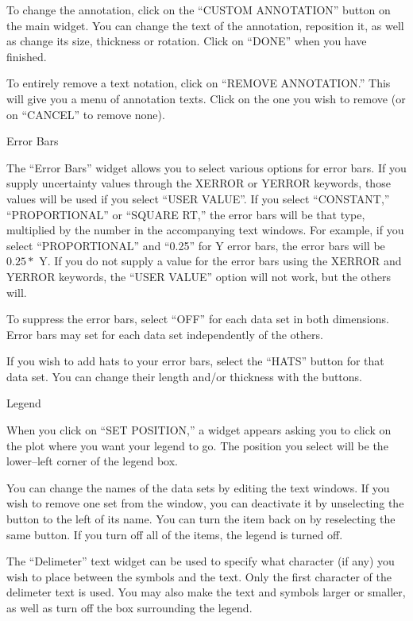 To change the annotation, click on the ``CUSTOM ANNOTATION'' button on the
main widget.  You can change the text of the annotation, reposition it, as 
well as change its size, thickness or rotation.  Click on ``DONE'' when you
have finished.  

To entirely remove a text notation, click on ``REMOVE ANNOTATION.''  This will
give you a menu of annotation texts.  Click on the one you wish to remove (or 
on ``CANCEL'' to remove none).

\vskip 3mm \centerline{\rmtwelve Error Bars}
	
The ``Error Bars'' widget allows you to select various options for error bars.
If you supply uncertainty values through the XERROR or YERROR keywords, those
values will be used if you select ``USER VALUE''.  If you select ``CONSTANT,''
``PROPORTIONAL'' or ``SQUARE RT,'' the error bars will be that type, multiplied
by the number in the accompanying text windows.  For example, if you select
``PROPORTIONAL'' and ``0.25'' for Y error bars, the error bars will be 
$0.25 *$ Y.  If you do not supply a value for the error bars using the 
XERROR and YERROR keywords, the ``USER VALUE'' option will not work, but the
others will.

To suppress the error bars, select ``OFF'' for each data set in both 
dimensions.  Error bars may set for each data set independently of the others.

If you wish to add hats to your error bars, select the ``HATS'' button for that
data set.  You can change their length and/or thickness with the buttons.

\vskip 3mm \centerline{\rmtwelve Legend}

When you click on ``SET POSITION,'' a widget appears asking you to click on
the plot where you want your legend to go.  The position you select will be the
lower--left corner of the legend box.

You can change the names of the data sets by editing the text windows.  If you
wish to remove one set from the window, you can deactivate it by unselecting 
the button to the left of its name.  You can turn the item back on by 
reselecting the same button.  If you turn off all of the items, the legend
is turned off.  

The ``Delimeter'' text widget can be used to specify what character (if any) 
you wish to place between the symbols and the text.  Only the first character
of the delimeter text is used.  You may also make the text and symbols larger 
or smaller, as well as turn off the box surrounding the legend.  

